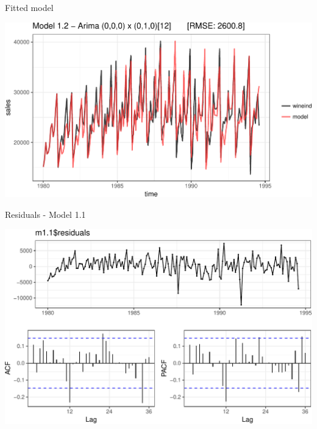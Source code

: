 \documentclass[11pt,ignorenonframetext,]{beamer}
\begin{document}
\begin{frame}{%
\protect\hypertarget{fitted-model-1}{%
Fitted model}}

\begin{center}\includegraphics[width=\textwidth]{Lec11_files/figure-beamer/unnamed-chunk-6-1} \end{center}

\end{frame}

\begin{frame}{%
\protect\hypertarget{residuals---model-1.1}{%
Residuals - Model 1.1}}

\begin{center}\includegraphics[width=\textwidth]{Lec11_files/figure-beamer/unnamed-chunk-7-1} \end{center}

\end{frame}
\end{document}
